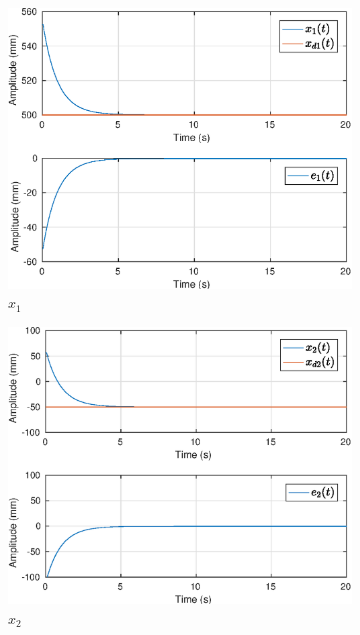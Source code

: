 \begin{figure}[H]
\centering
\begin{subfigure}{.5\textwidth}
  \centering
  \includegraphics[width=\linewidth]{./img/position1/x1.eps}
  \caption{$x_1$}
  \label{fig:oper_space_exp1_x1}
\end{subfigure}%
\begin{subfigure}{.5\textwidth}
  \centering
  \includegraphics[width=\linewidth]{./img/position1/x2.eps}
  \caption{$x_2$}
  \label{fig:oper_space_exp1_x2}
\end{subfigure}
\begin{subfigure}{.5\textwidth}

\end{subfigure}
\end{figure}
